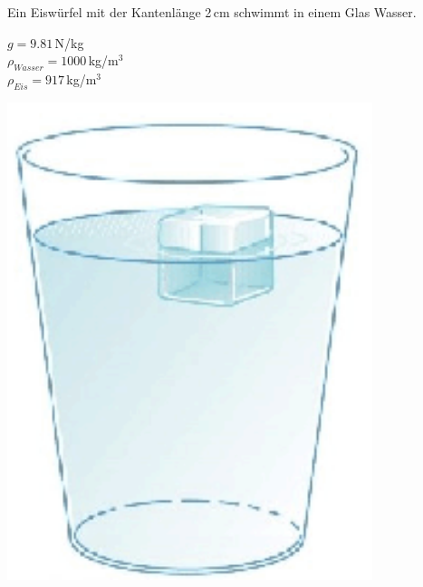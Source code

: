 \documentclass[11pt]{article}
\begin{document}
\begin{minipage}{0.8\textwidth}
Ein Eiswürfel mit der Kantenlänge 2\,cm schwimmt in einem Glas Wasser.

	$g = 9.81\,$N/kg\\
	$\rho_{Wasser} = 1000\,$kg/m$^3$ \\
	$\rho_{Eis} = 917\,$kg/m$^3$
\end{minipage}
\begin{minipage}{0.2\textwidth}
    \begin{flushright}
        \includegraphics[width=0.8\textwidth]{images/Beispiel-Eis.png}
    \end{flushright}
\end{minipage}
\end{document}
